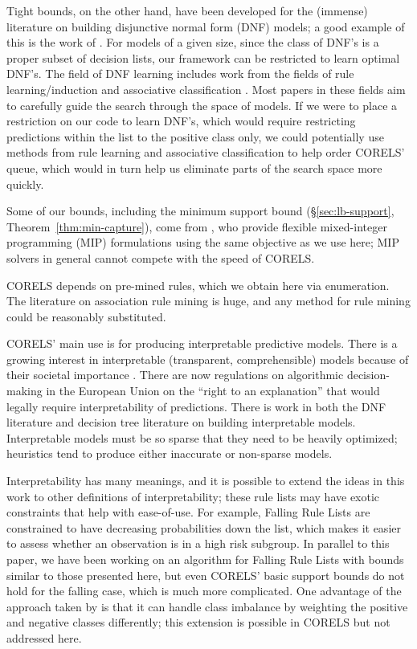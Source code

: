 Tight bounds, on the other hand, have been developed for the (immense) literature on building disjunctive normal form (DNF) models; a good example of this is the work of \citet{Rijnbeek10}.
%
For models of a given size, since the class of DNF's is a proper subset of decision lists, our framework can be restricted to learn optimal DNF's.
The field of DNF learning includes work from the fields of rule learning/induction \citep[\eg early algorithms by][]{Michalski1969,ClarkNiblett1989,Frank1998} and associative classification \citep{Vanhoof10}.
Most papers in these fields aim to carefully guide the search through the space of models. If we were to place a restriction on our code to learn DNF's, which would require restricting predictions within the list to the positive class only, we could potentially use methods from rule learning and associative classification to help order CORELS' queue, which would in turn help us eliminate parts of the search space more quickly.

Some of our bounds, including the minimum support bound
(\S\ref{sec:lb-support}, Theorem~\ref{thm:min-capture}),
come from \citet{ErtekinRu17}, who provide flexible mixed-integer programming (MIP)
formulations using the same objective as we use here;
MIP solvers in general cannot compete with the speed of CORELS.

CORELS depends on pre-mined rules, which we obtain here via enumeration.
The literature on association rule mining is huge, and any method for rule mining could be reasonably substituted.

CORELS' main use is for producing interpretable predictive models. There is a growing interest in interpretable (transparent, comprehensible) models because of their societal importance \citep[see][]{ruping2006learning,bratko1997machine,dawes1979robust,VellidoEtAl12,Giraud98,Holte93,Schmueli10,Huysmans11,Freitas14}. There are now regulations on algorithmic decision-making in the European Union on the ``right to an explanation'' \citep{Goodman2016EU} that would legally require interpretability of predictions. There is work in both the DNF literature \citep{Ruckert2008} and decision tree literature \citep{GarofalakisHyRaSh00} on building interpretable models. Interpretable models must be so sparse that they need to be heavily optimized; heuristics tend to produce either inaccurate or non-sparse models.

Interpretability has many meanings, and it is possible to extend the ideas in this work to other definitions of interpretability; these rule lists may have exotic constraints that help with ease-of-use. For example, Falling Rule Lists \citep{WangRu15} are constrained to have decreasing probabilities down the list, which makes it easier to assess whether an observation is in a high risk subgroup. In parallel to this paper, we have been working on an algorithm for Falling Rule Lists \citep{ChenRu18} with bounds similar to those presented here, but even CORELS' basic support bounds do not hold for the falling case, which is much more complicated. One advantage of the approach taken by \citet{ChenRu18} is that it can handle class imbalance by weighting the positive and negative classes differently; this extension is possible in CORELS but not addressed here.

